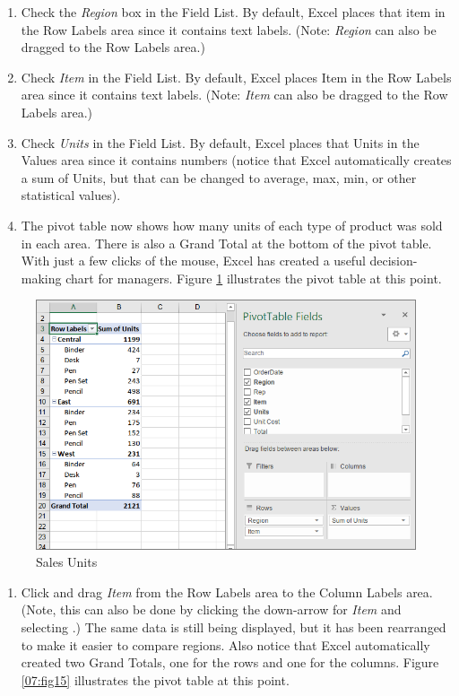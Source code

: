 \begin{enumerate}[resume]
	\item Check the \textit{Region} box in the Field List. By default, Excel places that item in the Row Labels area since it contains text labels. (Note: \textit{Region} can also be dragged to the Row Labels area.)
	\item Check \textit{Item} in the Field List. By default, Excel places Item in the Row Labels area since it contains text labels. (Note: \textit{Item} can also be dragged to the Row Labels area.)
	\item Check \textit{Units} in the Field List. By default, Excel places that Units in the Values area since it contains numbers (notice that Excel automatically creates a sum of Units, but that can be changed to average, max, min, or other statistical values). 
	\item The pivot table now shows how many units of each type of product was sold in each area. There is also a Grand Total at the bottom of the pivot table. With just a few clicks of the mouse, Excel has created a useful decision-making chart for managers. Figure \ref{07:fig14} illustrates the pivot table at this point.
\end{enumerate}

\begin{figure}[H]
	\centering
	\includegraphics[width=\maxwidth{.95\linewidth}]{gfx/ch07_fig14}
	\caption{Sales Units}
	\label{07:fig14}
\end{figure}
	
\begin{enumerate}[resume]
	\item Click and drag \textit{Item} from the Row Labels area to the Column Labels area. (Note, this can also be done by clicking the down-arrow for \textit{Item} and selecting .) The same data is still being displayed, but it has been rearranged to make it easier to compare regions. Also notice that Excel automatically created two Grand Totals, one for the rows and one for the columns. Figure \ref{07:fig15} illustrates the pivot table at this point.
\end{enumerate}	

